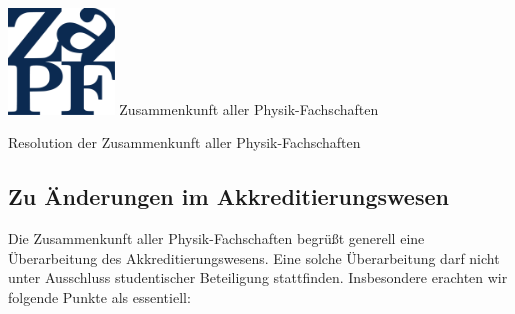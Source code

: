 \documentclass[DIV=calc]{scrartcl}
\begin{document}
    \hspace{0.87\textwidth}
    \begin{minipage}{120pt}
        \vspace{-1.8cm}
        \includegraphics[width=80pt]{../../logo.pdf}
        \centering
        \small Zusammenkunft aller Physik-Fachschaften
    \end{minipage}
    \begin{center}
        \huge{Resolution  der Zusammenkunft aller Physik-Fachschaften}\vspace{.25\baselineskip}\\
        \normalsize
    \end{center}
    \vspace{1cm}      
%
%
\subsection*{Zu Änderungen im Akkreditierungswesen}
Die Zusammenkunft aller Physik-Fachschaften begrüßt generell eine Überarbeitung des Akkreditierungswesens. Eine solche Überarbeitung darf nicht unter Ausschluss studentischer Beteiligung stattfinden. Insbesondere erachten wir folgende Punkte als essentiell:
\end{document}

